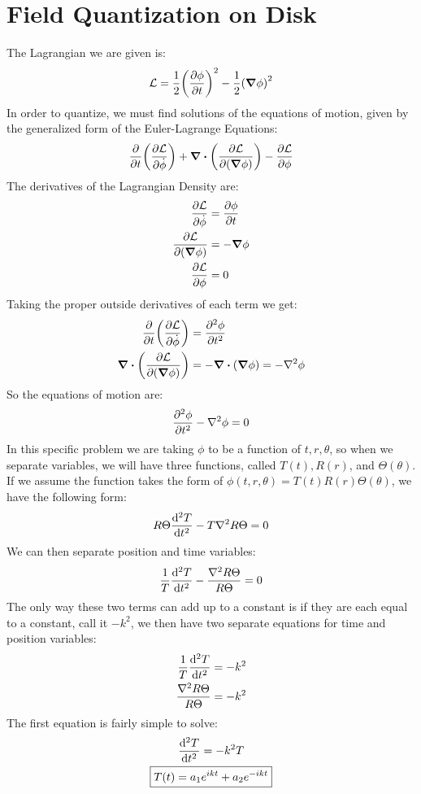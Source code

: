 \documentclass[12pt]{article}
\renewcommand{\L}{\mathcal{L}}
\begin{document}
\section{Field Quantization on Disk}
The Lagrangian we are given is:
\begin{align*}
  \L=\frac12\qty(\pdv{\phi}{t})^2-\frac12\qty(\grad\phi)^2
\end{align*}
In order to quantize, we must find solutions of the equations of motion, given by the generalized form of the Euler-Lagrange Equations:
\begin{align*}
  \pdv{t}\qty(\pdv{\L}{\dot{\phi}})
  +\div\qty(\pdv{\L}{(\grad{\phi})})
  -\pdv{\L}{\phi}
\end{align*}
The derivatives of the Lagrangian Density are:
\begin{align*}
  \pdv{\L}{\dot{\phi}}&=\pdv{\phi}{t}\\
  \pdv{\L}{(\grad{\phi})}&=-\grad{\phi}\\
  \pdv{\L}{\phi}&=0
\end{align*}
Taking the proper outside derivatives of each term we get:
\begin{align*}
  \pdv{t}\qty(\pdv{\L}{\dot{\phi}})&=\pdv[2]{\phi}{t}\\
  \div\qty(\pdv{\L}{(\grad{\phi})})&=-\div{(\grad{\phi})}=-\laplacian{\phi}
\end{align*}
So the equations of motion are:
\begin{align*}
  \pdv[2]{\phi}{t}-\laplacian{\phi}=0
\end{align*}
In this specific problem we are taking $\phi$ to be a function of $t,r,\theta$, so when we separate variables, we will have three functions, called $T(t),R(r)$, and $\Theta(\theta)$. If we assume the function takes the form of $\phi(t,r,\theta)=T(t)R(r)\Theta(\theta)$, we have the following form:
\begin{align*}
  R\Theta\dv[2]{T}{t}-T\laplacian{R\Theta}=0
\end{align*}
We can then separate position and time variables:
\begin{align*}
  \frac1T\dv[2]{T}{t}-\frac{\laplacian{R\Theta}}{R\Theta}=0
\end{align*}
The only way these two terms can add up to a constant is if they are each equal to a constant, call it $-k^2$, we then have two separate equations for time and position variables:
\begin{align*}
  \frac1T\dv[2]{T}{t}&=-k^2\\
  \frac{\laplacian{R\Theta}}{R\Theta}&=-k^2
\end{align*}
The first equation is fairly simple to solve:
\begin{gather*}
  \dv[2]{T}{t}=-k^2T\\
  \boxed{T(t)=a_1e^{ikt}+a_2e^{-ikt}}
\end{gather*}
\end{document}
